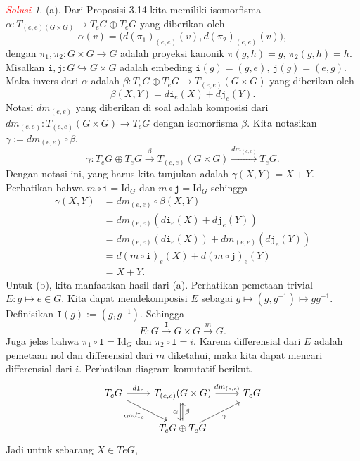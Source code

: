 \documentclass[11pt]{article}
\theoremstyle{definition}
\theoremstyle{remark}
\newtheorem*{solution}{\textcolor{red}{Solusi}}
\begin{document}
\begin{solution}
(a). Dari Proposisi 3.14 kita memiliki isomorfisma $\alpha : T_{(e,e)(G \times G)} \to T_eG \oplus T_eG$ yang diberikan oleh
$$
\alpha(v) = \Big(d(\pi_1)_{(e,e)}(v), d(\pi_2)_{(e,e)}(v) \Big),
$$
dengan $\pi_1, \pi_2 : G \times G \to G$ adalah proyeksi kanonik $\pi(g,h) = g, \,\pi_2(g,h) = h$. Misalkan $\mathtt{i}, \mathtt{j} : G \hookrightarrow G \times G$ adalah embeding $\mathtt{i}(g)=(g,e), \, \mathtt{j}(g)=(e,g)$. Maka invers dari $\alpha$ adalah $\beta : T_eG \oplus T_eG \to T_{(e,e)}(G \times G)$ yang diberikan oleh
$$
\beta(X,Y) = d\mathtt{i}_e(X) + d\mathtt{j}_e(Y).
$$
Notasi $dm_{(e,e)}$ yang diberikan di soal adalah komposisi dari $dm_{(e,e)} : T_{(e,e)}(G \times G) \to T_eG$ dengan isomorfisma $\beta$. Kita notasikan $\gamma  := dm_{(e,e)} \circ \beta $.
$$
\gamma : T_eG \oplus T_eG \xrightarrow{\beta}T_{(e,e)}(G\times G) \xrightarrow{dm_{(e,e)}} T_eG.
$$ 
Dengan notasi ini, yang harus kita tunjukan adalah $\gamma(X,Y) = X + Y$. Perhatikan bahwa $m \circ \mathtt{i} = \text{Id}_G$ dan $m \circ \mathtt{j} = \text{Id}_G$ sehingga
\begin{align*}
\gamma(X,Y) &= dm_{(e,e)} \circ \beta(X,Y) \\
&= dm_{(e,e)} (d\mathtt{i}_e(X)+d\mathtt{j}_e(Y)) \\ &= dm_{(e,e)} (d\mathtt{i}_e(X)) + dm_{(e,e)} (d\mathtt{j}_e(Y)) \\
&= d(m \circ \mathtt{i})_e(X) + d(m \circ \mathtt{j})_e(Y) \\
&= X + Y.
\end{align*}
Untuk (b), kita manfaatkan hasil dari (a). Perhatikan pemetaan trivial $E : g \mapsto e \in G$. Kita dapat mendekomposisi $E$ sebagai $g \mapsto (g,g^{-1}) \mapsto gg^{-1}$. Definisikan $\mathtt{I}(g) := (g,g^{-1})$. Sehingga
$$
E : G  \xrightarrow{\mathtt{I}} G \times G \xrightarrow{m} G.
$$
Juga jelas bahwa $\pi_1 \circ \mathtt{I} = \text{Id}_G$ dan $\pi_2 \circ \mathtt{I} = i$. Karena differensial dari $E$ adalah pemetaan nol dan differensial dari $m$ diketahui, maka kita dapat mencari differensial dari $i$. Perhatikan diagram komutatif berikut.
\[
\begin{tikzcd}
T_eG  \arrow[rightarrow]{r}{d\mathtt{I}_e} \arrow[swap]{dr}{\alpha \circ d\mathtt{I}_e} & T_{(e,e)}(G \times G) \arrow{r}{dm_{(e,e)}} \arrow[swap, shift right]{d}{\alpha} & T_eG \\
&T_eG \oplus T_eG \arrow[swap]{u}{\beta} \arrow[swap, shift right]{ur}{\gamma}&
\end{tikzcd}
\]
Jadi untuk sebarang $X \in TeG$,

\end{solution}
\end{document}

